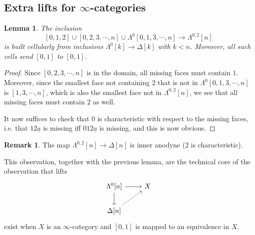 \documentclass[a4paper,10pt
,draft
]{article}%
\numberwithin{equation}{section}
\numberwithin{figure}{section}
\newtheorem{lemma}[equation]{Lemma}%
\theoremstyle{definition} %
\newtheorem{remark}[equation]{Remark}%
\newcommand{\1}{\ensuremath{\mathbbm 1}}%
\begin{document}
\subsection{Extra lifts for $\infty$-categories}


\begin{lemma}
The inclusion 
\[[0,1,2] \cup [0,2,3,\cdots,n] \cup 
\Lambda^0[0,1,3,\cdots,n]
 \to \Lambda^{0,2}[n]\]
is built cellularly from inclusions
$\Lambda^0[k] \to \Delta[k]$ with $k<n$.
Moreover, all such cells send $[0,1]$ to $[0,1]$.
\end{lemma}

\begin{proof}
Since $[0,2,3,\cdots,n]$ is in the domain, all missing faces must contain $1$.
Moreover, since the smallest face not containing $2$
that is not in $\Lambda^0[0,1,3,\cdots,n]$ is $[1,3,\cdots,n]$,
which is also the smallest face not in $\Lambda^{0,2}[n]$,
we see that all missing faces must contain $2$ as well.

It now suffices to check that $0$ is characteristic with respect to the missing faces, i.e.
that $12\underline{a}$ is missing iff $012\underline{a}$ is missing, and this is now obvious. 
\end{proof}

\begin{remark}
	The map $\Lambda^{0,2}[n] \to \Delta[n]$ is inner anodyne ($2$ is characteristic).
	
	This observation, together with the previous lemma, are the technical core of the observation that lifts
\[
	\begin{tikzcd}
	\Lambda^{0}[n] \ar{d}  \ar{r} & X
\\
	\Delta[n] \ar[dashed]{ru}
	\end{tikzcd}
\]
exist when $X$ is an $\infty$-category and $[0,1]$ is mapped to an equivalence in $X$.
\end{remark}
\end{document}
